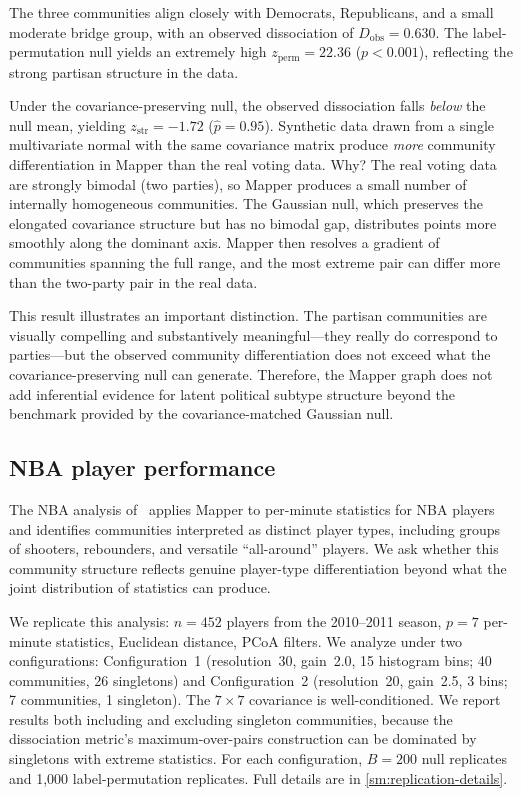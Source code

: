 \documentclass[hidelinks]{siamart251216}
\begin{document}
The three communities align closely with Democrats, Republicans, and a
small moderate bridge group, with an observed dissociation of
$D_{\mathrm{obs}} = 0.630$.  The label-permutation null yields an
extremely high $z_{\mathrm{perm}} = 22.36$ ($p < 0.001$), reflecting
the strong partisan structure in the data.

Under the covariance-preserving null, the observed dissociation falls
\emph{below} the null mean, yielding $z_{\mathrm{str}} = -1.72$
($\hat{p} = 0.95$).  Synthetic data drawn from a
single multivariate normal with the same covariance matrix produce
\emph{more} community differentiation in Mapper than the real voting
data.  Why?  The real voting data are strongly bimodal (two parties),
so Mapper produces a small number of internally homogeneous communities.
The Gaussian null, which preserves the elongated covariance structure but
has no bimodal gap, distributes points more smoothly along the dominant
axis.  Mapper then resolves a gradient of communities spanning the full
range, and the most extreme pair can differ more than the two-party pair
in the real data.

This result illustrates an important distinction. The partisan
communities are visually compelling and substantively meaningful---they
really do correspond to parties---but the observed community
differentiation does not exceed what the covariance-preserving null
can generate. Therefore, the Mapper graph does not add inferential
evidence for latent political subtype structure beyond the benchmark
provided by the covariance-matched Gaussian null.


\subsection{NBA player performance}\label{sec:res-nba}

The NBA analysis of~\cite{Lum2013} applies Mapper to per-minute
statistics for NBA players and identifies communities interpreted as
distinct player types, including groups of shooters, rebounders, and
versatile ``all-around'' players.  We ask whether this community
structure reflects genuine player-type differentiation beyond what the
joint distribution of statistics can produce.

We replicate this analysis: $n = 452$ players from
the 2010--2011 season, $p = 7$ per-minute statistics, Euclidean distance,
PCoA filters.  We analyze under two configurations:
Configuration~1 (resolution~30, gain~2.0, 15 histogram bins;
40 communities, 26 singletons) and Configuration~2 (resolution~20,
gain~2.5, 3 bins; 7 communities, 1 singleton).  The $7 \times 7$ covariance is well-conditioned.  We
report results both including and excluding singleton communities,
because the dissociation metric's maximum-over-pairs construction can be
dominated by singletons with extreme statistics.  For each
configuration, $B = 200$ null replicates and 1,000 label-permutation
replicates.  Full details are in \cref{sm:replication-details}.
\end{document}
